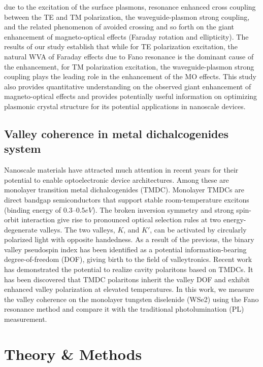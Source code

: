 \documentclass[13pt]{article}
\begin{document}
due to the excitation of the surface plasmons, resonance enhanced cross coupling between the TE and TM polarization, the waveguide-plasmon strong coupling, and the related phenomenon of avoided crossing and so forth on the giant enhancement of magneto-optical effects (Faraday rotation and ellipticity). The results of our study establish that while for TE polarization excitation, the natural WVA of Faraday effects due to Fano resonance is the dominant cause of the enhancement, for TM polarization excitation, the waveguide-plasmon strong coupling plays the leading role in the enhancement of the MO effects. This study also provides quantitative understanding on the observed giant enhancement of magneto-optical effects and provides potentially useful information on optimizing plasmonic crystal structure for its potential applications in nanoscale devices.
\subsection{Valley coherence in metal dichalcogenides system}
\noindent
\par 
	Nanoscale materials have attracted much attention in recent years for their potential to enable optoelectronic device architectures. Among these are monolayer transition metal dichalcogenides (TMDC). Monolayer TMDCs are direct bandgap semiconductors that support stable room-temperature excitons (binding energy of $0.3–0.5 eV$). The broken inversion symmetry and strong spin-orbit interaction give rise to pronounced optical selection rules at two energy-degenerate valleys. The two valleys, $K$, and $K'$, can be activated by circularly polarized light with opposite handedness. As a result of the previous, the binary valley pseudospin index has been identified as a potential information-bearing degree-of-freedom (DOF), giving birth to the field of valleytronics. Recent work has demonstrated the potential to realize cavity polaritons based on TMDCs. It has been discovered that TMDC polaritons inherit the valley DOF and exhibit enhanced valley polarization at elevated temperatures. In this work, we measure the valley coherence on the monolayer tungsten diselenide (WSe2) using the Fano resonance method and compare it with the traditional photolumination (PL) measurement.


\section{Theory \& Methods}
\end{document}
